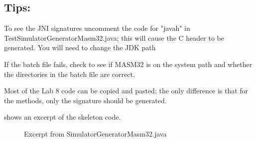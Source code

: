 \ei

\subsection{Tips:}

\biTight

\item To see the JNI signatures uncomment the code for "javah" in TestSimulatorGeneratorMasm32.java; this will cause the C header to be generated. You will need to change the JDK path

\item If the batch file fails, check to see if MASM32 is on the system path and whether the directories in the batch file are correct.

\item Most of the Lab 8 code can be copied and pasted; the only difference is that for the methods, only the signature should be generated.

\ei

\noindent
%
 shows an excerpt of the skeleton code.

\begin{figure}
\label{fig:masm32.java}
\caption{Excerpt from SimulatorGeneratorMasm32.java}

\end{figure}
